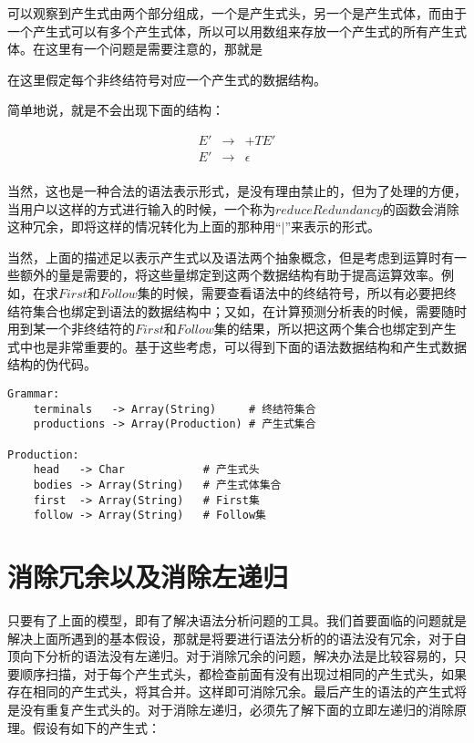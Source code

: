 可以观察到产生式由两个部分组成，一个是产生式头，另一个是产生式体，而由于一个产生式可以有多个产生式体，所以可以用数组来存放一个产生式的所有产生式体。在这里有一个问题是需要注意的，那就是\begin{bfseries}在这里假定每个非终结符号对应一个产生式的数据结构。\end{bfseries}简单地说，就是不会出现下面的结构：

\begin{eqnarray*}
    E' & \rightarrow & +TE' \\
    E' & \rightarrow & \epsilon \\
\end{eqnarray*}

当然，这也是一种合法的语法表示形式，是没有理由禁止的，但为了处理的方便，当用户以这样的方式进行输入的时候，一个称为$reduceRedundancy$的函数会消除这种冗余，即将这样的情况转化为上面的那种用``$|$''来表示的形式。

当然，上面的描述足以表示产生式以及语法两个抽象概念，但是考虑到运算时有一些额外的量是需要的，将这些量绑定到这两个数据结构有助于提高运算效率。例如，在求$First$和$Follow$集的时候，需要查看语法中的终结符号，所以有必要把终结符集合也绑定到语法的数据结构中；又如，在计算预测分析表的时候，需要随时用到某一个非终结符的$First$和$Follow$集的结果，所以把这两个集合也绑定到产生式中也是非常重要的。基于这些考虑，可以得到下面的语法数据结构和产生式数据结构的伪代码。

\begin{verbatim}
Grammar:
    terminals   -> Array(String)     # 终结符集合
    productions -> Array(Production) # 产生式集合

Production:
    head   -> Char            # 产生式头
    bodies -> Array(String)   # 产生式体集合
    first  -> Array(String)   # First集
    follow -> Array(String)   # Follow集
\end{verbatim}

\section{消除冗余以及消除左递归}

只要有了上面的模型，即有了解决语法分析问题的工具。我们首要面临的问题就是解决上面所遇到的基本假设，那就是将要进行语法分析的的语法没有冗余，对于自顶向下分析的语法没有左递归。对于消除冗余的问题，解决办法是比较容易的，只要顺序扫描，对于每个产生式头，都检查前面有没有出现过相同的产生式头，如果存在相同的产生式头，将其合并。这样即可消除冗余。最后产生的语法的产生式将是没有重复产生式头的。对于消除左递归，必须先了解下面的立即左递归的消除原理。假设有如下的产生式：

